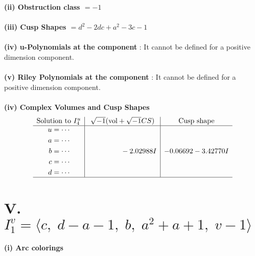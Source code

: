\documentclass[1p]{elsarticle_modified}
\theoremstyle{definition}
\newcommand{\I}{\sqrt{-1}}
\begin{document}
\flushleft \textbf{(ii) Obstruction class $= -1$}\\~\\
\flushleft \textbf{(iii) Cusp Shapes $= d^2-2 d c+a^2-3 c-1$}\\~\\
\flushleft \textbf{(iv) u-Polynomials at the component} : It cannot be defined for a positive dimension component.\\~\\
\flushleft \textbf{(v) Riley Polynomials at the component} : It cannot be defined for a positive dimension component.\\~\\
\newpage\flushleft \textbf{(iv) Complex Volumes and Cusp Shapes}
$$\begin{array}{c|c|c} 
\text{Solution to }I^u_{4}& \I (\text{vol} + \sqrt{-1}CS) & \text{Cusp shape}\\
 \hline 
\begin{aligned}
u &= \cdots \\
a &= \cdots \\
b &= \cdots \\
c &= \cdots \\
d &= \cdots\end{aligned}
 & \phantom{-0.000000 } -2.02988 I & -0.06692 - 3.42770 I\\
 \hline 
 \end{array}
$$\newpage\renewcommand{\arraystretch}{1}
\centering \section*{V. $I^v_{1}= \langle c,\;d- a-1,\;b,\;a^2+a+1,\;v-1 \rangle$}
\flushleft \textbf{(i) Arc colorings}\\
\end{document}
